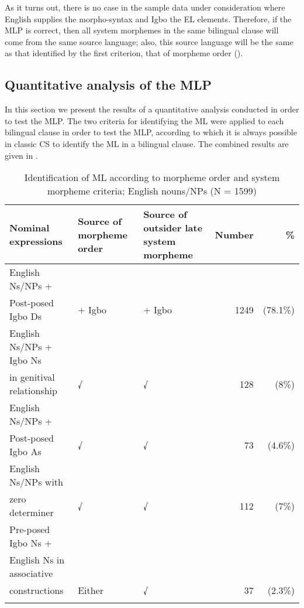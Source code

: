 \documentclass[output=paper]{langsci/langscibook}
\begin{document}
As it turns out, there is no case in the sample data under consideration where English supplies the morpho-syntax and Igbo the EL elements. Therefore, if the MLP is correct, then all system morphemes in the same bilingual clause will come from the same source language; also, this source language will be the same as that identified by the first criterion, that of morpheme order ().

\subsection{Quantitative analysis of the MLP}

In this section we present the results of a quantitative analysis conducted in order to test the MLP. The two criteria for identifying the ML were applied to each bilingual clause in order to test the MLP, according to which it is always possible in classic CS to identify the ML in a bilingual clause. The combined results are given in . 
 
\begin{table}
\caption{Identification of ML according to morpheme order and system morpheme criteria; {English nouns/NPs (N = 1599)}}

\begin{tabularx}{\textwidth}{Xp{2cm}p{2cm}rr}
\lsptoprule
Nominal expressions                                             & Source of morpheme order & Source of outsider late system morpheme & Number & \% \\
\midrule
English Ns/NPs + \\
Post-posed Igbo Ds                   & + Igbo   &   + Igbo & 1249 & (78.1\%) \\
English Ns/NPs + Igbo Ns \\
in genitival relationship             &     √     &    √       & 128 & (8\%)     \\
English Ns/NPs + \\
Post-posed Igbo As                            &  √      &     √      &  73  &(4.6\%)   \\

English Ns/NPs with \\
zero determiner                            &  √     &      √      &  112  &(7\%)   \\

Pre-posed Igbo Ns + \\
English Ns in associative \\
constructions   &   Either    &       √      & 37 & (2.3\%)   \\
\lspbottomrule
\end{tabularx}
\label{tab:2}
\end{table} 
\end{document}
